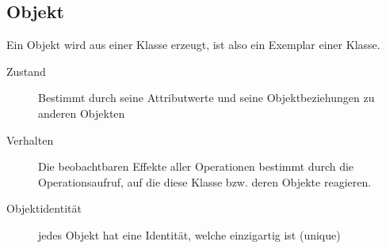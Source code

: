 \subsection{Objekt }
	Ein Objekt wird aus einer Klasse erzeugt, ist also ein Exemplar einer Klasse.
	\begin{description}
		\item[Zustand] 
      Bestimmt durch seine Attributwerte und seine Objektbeziehungen zu anderen Objekten
		\item[Verhalten] 
      Die beobachtbaren Effekte aller Operationen bestimmt durch die Operationsaufruf, 
      auf die diese Klasse bzw. deren Objekte reagieren.
		\item[Objektidentität] 
      jedes Objekt hat eine Identität, welche einzigartig ist (unique)
	\end{description}
	
  
